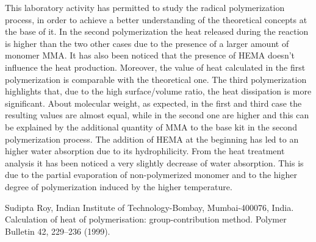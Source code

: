 \documentclass[a4paper, 11pt]{article}
\begin{document}
This laboratory activity has permitted to study the radical polymerization process, in order to achieve a better understanding of the theoretical concepts at the base of it.
In the second polymerization the heat released during the reaction is higher than the two other cases due to the presence of a larger amount of monomer MMA. It has also been noticed that the presence of HEMA doesn't influence the heat production. Moreover, the value of heat calculated in the first polymerization is comparable with the theoretical one. The third polymerization highlights that, due to the high surface/volume ratio, the heat dissipation is more significant. About molecular weight, as expected, in the first and third case the resulting values are almost equal, while in the second one are higher and this can be explained by the additional quantity of MMA to the base kit in the second polymerization process. The addition of HEMA at the beginning has led to an higher water absorption due to its hydrophilicity. From the heat treatment analysis it has been noticed a very slightly decrease of water absorption. This is due to the partial evaporation of non-polymerized monomer and to the higher degree of polymerization induced by the higher temperature.


\newpage
\thispagestyle{empty}


\begin{thebibliography}{11}

 Sudipta Roy, Indian Institute of Technology-Bombay, Mumbai-400076, India. Calculation of heat of polymerisation: group-contribution method. Polymer Bulletin 42, 229–236 (1999).

\end{thebibliography}
\end{document}
